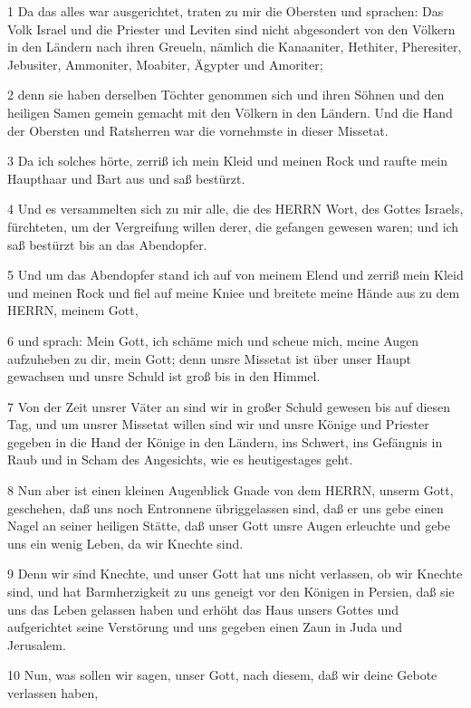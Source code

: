 \par 1 Da das alles war ausgerichtet, traten zu mir die Obersten und sprachen: Das Volk Israel und die Priester und Leviten sind nicht abgesondert von den Völkern in den Ländern nach ihren Greueln, nämlich die Kanaaniter, Hethiter, Pheresiter, Jebusiter, Ammoniter, Moabiter, Ägypter und Amoriter;
\par 2 denn sie haben derselben Töchter genommen sich und ihren Söhnen und den heiligen Samen gemein gemacht mit den Völkern in den Ländern. Und die Hand der Obersten und Ratsherren war die vornehmste in dieser Missetat.
\par 3 Da ich solches hörte, zerriß ich mein Kleid und meinen Rock und raufte mein Haupthaar und Bart aus und saß bestürzt.
\par 4 Und es versammelten sich zu mir alle, die des HERRN Wort, des Gottes Israels, fürchteten, um der Vergreifung willen derer, die gefangen gewesen waren; und ich saß bestürzt bis an das Abendopfer.
\par 5 Und um das Abendopfer stand ich auf von meinem Elend und zerriß mein Kleid und meinen Rock und fiel auf meine Kniee und breitete meine Hände aus zu dem HERRN, meinem Gott,
\par 6 und sprach: Mein Gott, ich schäme mich und scheue mich, meine Augen aufzuheben zu dir, mein Gott; denn unsre Missetat ist über unser Haupt gewachsen und unsre Schuld ist groß bis in den Himmel.
\par 7 Von der Zeit unsrer Väter an sind wir in großer Schuld gewesen bis auf diesen Tag, und um unsrer Missetat willen sind wir und unsre Könige und Priester gegeben in die Hand der Könige in den Ländern, ins Schwert, ins Gefängnis in Raub und in Scham des Angesichts, wie es heutigestages geht.
\par 8 Nun aber ist einen kleinen Augenblick Gnade von dem HERRN, unserm Gott, geschehen, daß uns noch Entronnene übriggelassen sind, daß er uns gebe einen Nagel an seiner heiligen Stätte, daß unser Gott unsre Augen erleuchte und gebe uns ein wenig Leben, da wir Knechte sind.
\par 9 Denn wir sind Knechte, und unser Gott hat uns nicht verlassen, ob wir Knechte sind, und hat Barmherzigkeit zu uns geneigt vor den Königen in Persien, daß sie uns das Leben gelassen haben und erhöht das Haus unsers Gottes und aufgerichtet seine Verstörung und uns gegeben einen Zaun in Juda und Jerusalem.
\par 10 Nun, was sollen wir sagen, unser Gott, nach diesem, daß wir deine Gebote verlassen haben,
